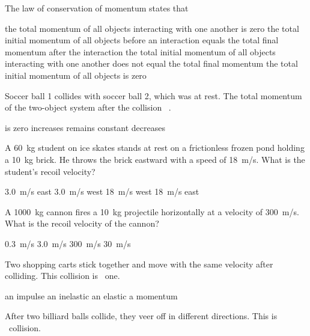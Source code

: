 \documentclass{exam}
\begin{document}
\begin{questions}
\question
The law of conservation of momentum states that

\begin{randomizechoices}
    \choice the total momentum of all objects interacting with one another is zero
    \correctchoice the total initial momentum of all objects before an interaction equals the total final momentum after the interaction
    \choice the total initial momentum of all objects interacting with one another does not equal the total final momentum  
    \choice the total initial momentum of all objects is zero 
\end{randomizechoices}

\clearpage
\question
Soccer ball 1 collides with soccer ball 2, which was at rest. The total momentum of the two-object system after the collision \fillin\ .

\begin{randomizechoices}
    \choice is zero
    \choice increases
    \correctchoice remains constant
    \choice decreases
\end{randomizechoices}

\question
A \SI{60}{kg} student on ice skates stands at rest on a frictionless frozen pond holding a \SI{10}{kg} brick. He throws the brick eastward with a speed of \SI{18}{m/s}. What is the student's recoil velocity?

\begin{randomizechoices}
\choice \SI{3.0}{m/s} east
\correctchoice \SI{3.0}{m/s} west
\choice \SI{18}{m/s} west
\choice \SI{18}{m/s} east
\end{randomizechoices}

\question
A \SI{1000}{kg} cannon fires a \SI{10}{kg} projectile horizontally at a velocity of \SI{300}{m/s}. What is the recoil velocity of the cannon?

\begin{randomizechoices}
\choice \SI{0.3}{m/s}
\correctchoice \SI{3.0}{m/s}
\choice \SI{300}{m/s}
\choice \SI{30}{m/s}
\end{randomizechoices}

\question
Two shopping carts stick together and move with the same velocity after colliding. This collision is \fillin\ one.

\begin{randomizechoices}
\choice an impulse
\correctchoice an inelastic
\choice an elastic
\choice a momentum
\end{randomizechoices}

\question
After two billiard balls collide, they veer off in different directions. This is \fillin\ collision.


\end{questions}
\end{document}
